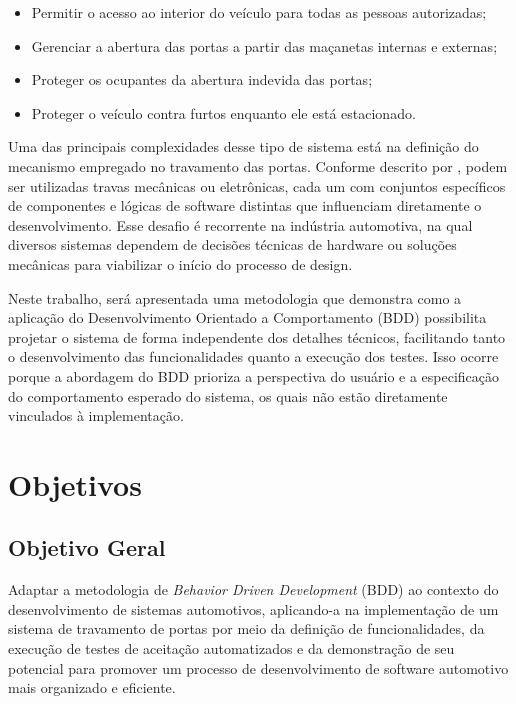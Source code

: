 \begin{itemize}
    \item Permitir o acesso ao interior do veículo para todas as pessoas autorizadas;
    \item Gerenciar a abertura das portas a partir das maçanetas internas e externas;
    \item Proteger os ocupantes da abertura indevida das portas;
    \item Proteger o veículo contra furtos enquanto ele está estacionado.
\end{itemize}

Uma das principais complexidades desse tipo de sistema está na definição do mecanismo empregado no travamento das portas. Conforme descrito por 
, podem ser utilizadas travas mecânicas ou eletrônicas, cada um com conjuntos específicos de componentes e lógicas de 
software distintas que influenciam diretamente o desenvolvimento. Esse desafio é recorrente na indústria automotiva, na qual diversos sistemas dependem 
de decisões técnicas de hardware ou soluções mecânicas para viabilizar o início do processo de design.

Neste trabalho, será apresentada uma metodologia que demonstra como a aplicação do Desenvolvimento Orientado a Comportamento (BDD) possibilita projetar o 
sistema de forma independente dos detalhes técnicos, facilitando tanto o desenvolvimento das funcionalidades quanto a execução dos testes. Isso ocorre 
porque a abordagem do BDD prioriza a perspectiva do usuário e a especificação do comportamento esperado do sistema, os quais não estão diretamente vinculados 
à implementação.

\section{\textbf{Objetivos}}

\subsection{Objetivo Geral}
Adaptar a metodologia de \textit{Behavior Driven Development} (BDD) ao contexto do desenvolvimento de sistemas automotivos, aplicando-a na implementação de um sistema 
de travamento de portas por meio da definição de funcionalidades, da execução de testes de aceitação automatizados e da demonstração de seu potencial para promover um 
processo de desenvolvimento de software automotivo mais organizado e eficiente.

